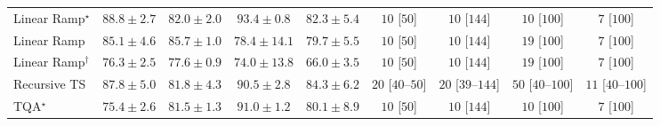 \begin{tabular}{l|cccc|cccc|}
Linear Ramp$^\star$ & {\cellcolor[HTML]{863595}} \color[HTML]{F1F1F1} $88.8\pm 2.7$ & {\cellcolor[HTML]{8C85BE}} \color[HTML]{F1F1F1} $82.0\pm 2.0$ & {\cellcolor[HTML]{670864}} \color[HTML]{F1F1F1} $93.4\pm 0.8$ & {\cellcolor[HTML]{8C81BC}} \color[HTML]{F1F1F1} $82.3\pm 5.4$ & {\cellcolor[HTML]{FFF6F2}} \color[HTML]{000000} $10$ [$50$] & {\cellcolor[HTML]{FFF6F2}} \color[HTML]{000000} $10$ [$144$] & {\cellcolor[HTML]{FFF6F2}} \color[HTML]{000000} $10$ [$100$] & {\cellcolor[HTML]{FFF6F2}} \color[HTML]{000000} $7$ [$100$] \\
Linear Ramp & {\cellcolor[HTML]{8B61AC}} \color[HTML]{F1F1F1} $85.1\pm 4.6$ & {\cellcolor[HTML]{8A5AA9}} \color[HTML]{F1F1F1} $85.7\pm 1.0$ & {\cellcolor[HTML]{96ACD2}} \color[HTML]{F1F1F1} $78.4\pm 14.1$ & {\cellcolor[HTML]{909FCB}} \color[HTML]{F1F1F1} $79.7\pm 5.5$ & {\cellcolor[HTML]{FFF6F2}} \color[HTML]{000000} $10$ [$50$] & {\cellcolor[HTML]{FFF6F2}} \color[HTML]{000000} $10$ [$144$] & {\cellcolor[HTML]{FFF3F0}} \color[HTML]{000000} $19$ [$100$] & {\cellcolor[HTML]{FFF6F2}} \color[HTML]{000000} $7$ [$100$] \\
Linear Ramp$^\dagger$ & {\cellcolor[HTML]{A3BFDC}} \color[HTML]{000000} $76.3\pm 2.5$ & {\cellcolor[HTML]{9AB4D6}} \color[HTML]{000000} $77.6\pm 0.9$ & {\cellcolor[HTML]{B7CEE3}} \color[HTML]{000000} $74.0\pm 13.8$ & {\cellcolor[HTML]{F6FBFD}} \color[HTML]{000000} $66.0\pm 3.5$ & {\cellcolor[HTML]{FFF6F2}} \color[HTML]{000000} $10$ [$50$] & {\cellcolor[HTML]{FFF6F2}} \color[HTML]{000000} $10$ [$144$] & {\cellcolor[HTML]{FFF3F0}} \color[HTML]{000000} $19$ [$100$] & {\cellcolor[HTML]{FFF6F2}} \color[HTML]{000000} $7$ [$100$] \\
Recursive TS & {\cellcolor[HTML]{88439E}} \color[HTML]{F1F1F1} $87.8\pm 5.0$ & {\cellcolor[HTML]{8C88BF}} \color[HTML]{F1F1F1} $81.8\pm 4.3$ & {\cellcolor[HTML]{831D85}} \color[HTML]{F1F1F1} $90.5\pm 2.8$ & {\cellcolor[HTML]{8C6AB1}} \color[HTML]{F1F1F1} $84.3\pm 6.2$ & {\cellcolor[HTML]{FFF3F0}} \color[HTML]{000000} $20$ [$40$--$50$] & {\cellcolor[HTML]{FFF3F0}} \color[HTML]{000000} $20$ [$39$--$144$] & {\cellcolor[HTML]{FEECE9}} \color[HTML]{000000} $50$ [$40$--$100$] & {\cellcolor[HTML]{FFF6F2}} \color[HTML]{000000} $11$ [$40$--$100$] \\
TQA$^\star$ & {\cellcolor[HTML]{ABC5DF}} \color[HTML]{000000} $75.4\pm 2.6$ & {\cellcolor[HTML]{8C8BC0}} \color[HTML]{F1F1F1} $81.5\pm 1.3$ & {\cellcolor[HTML]{821781}} \color[HTML]{F1F1F1} $91.0\pm 1.2$ & {\cellcolor[HTML]{8E9AC8}} \color[HTML]{F1F1F1} $80.1\pm 8.9$ & {\cellcolor[HTML]{FFF6F2}} \color[HTML]{000000} $10$ [$50$] & {\cellcolor[HTML]{FFF6F2}} \color[HTML]{000000} $10$ [$144$] & {\cellcolor[HTML]{FFF6F2}} \color[HTML]{000000} $10$ [$100$] & {\cellcolor[HTML]{FFF6F2}} \color[HTML]{000000} $7$ [$100$] \\

\end{tabular}
